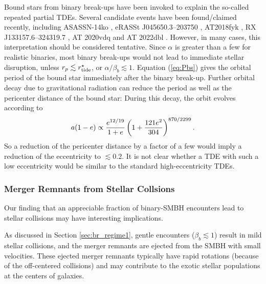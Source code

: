 \documentclass[twocolumn]{aastex631}
\begin{document}
Bound stars from binary break-ups have been invoked to explain the so-called repeated partial TDEs. 
Several candidate events have been found/claimed recently, including 
ASASSN-14ko 
\citep[period 115.2 days;][]{Payne2021ApJ,Payne2022ApJ,Payne2023ApJ,Huang2023ApJL}, 
eRASSt J045650.3–203750 
\citep[$299 \rightarrow 193$ days;][]{Liu2023AA,Liu2024AA}, 
AT2018fyk 
\citep[$\sim 1200$ days;][]{Wevers2023ApJL}, 
RX J133157.6–324319.7 
\citep[$\sim 10000$ days;][]{Hampel2022RAA,Malyali2023MNRAS}, 
AT 2020vdq 
\citep[$\sim 870$ days;][]{Somalwar2023arXiv}
and AT 2022dbl 
\citep[$\sim 710$ days;][]{Lin2024ApJL}.  
However, in many cases, this interpretation should be considered tentative.  
Since $\alpha$ is greater than a few for realistic binaries, most binary break-ups would not lead to immediate stellar disruption, unless $r_p\lesssim r_{\rm tide}^\star$, or $\alpha/\beta_b \lesssim 1$.  
Equation (\ref{eq:Pbs}) gives the orbital period of the bound star immediately after the binary break-up. 
Further orbital decay due to gravitational radiation can reduce the period as well as the pericenter distance of the bound star:
During this decay, the orbit evolves according to
\citep{Peters1964PR}
\begin{equation}
  a(1-e)\propto {e^{12/19} \over 1+e} \left(1+{121e^2\over 304}\right)^{870/2299}.
\end{equation}
So a reduction of the pericenter distance by a factor of a few would imply a reduction of the eccentricity to $\lesssim 0.2$. 
It is not clear whether a TDE with such a low eccentricity would be similar to the standard high-eccentricity TDEs.


\subsubsection{Merger Remnants from Stellar Collsions}
\label{sec:app_merger_remnants}

Our finding that an appreciable fraction of binary-SMBH encounters lead to stellar collisions may have interesting implications.

As discussed in Section \ref{sec:br_regime1}, gentle encounters ($\beta_b\lesssim 1$) result in mild stellar collisions, and the merger remnants are ejected from the SMBH with small velocities. 
These ejected merger remnants typically have rapid rotations (because of the off-centered collisions) and may contribute to the exotic stellar populations at the centers of galaxies.
\end{document}
